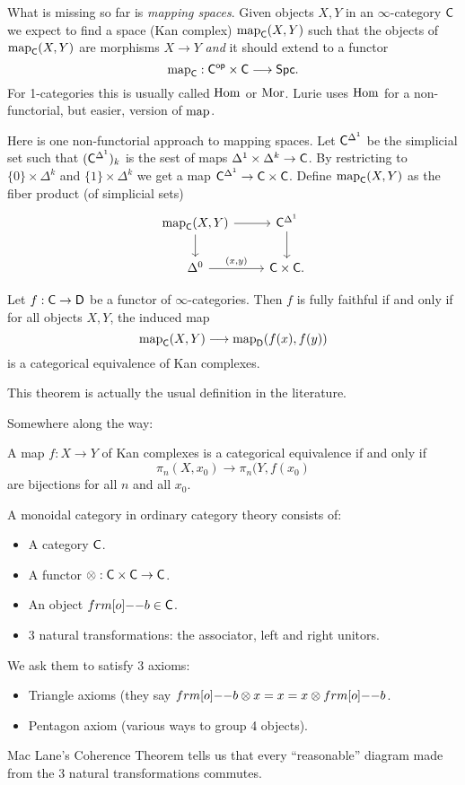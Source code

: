 What is missing so far is \emph{mapping spaces}. Given objects $X,Y$ in an $\infty$-category $\mathsf{C}$ we expect to find a space (Kan complex) $\operatorname{map}_\mathsf{C}(X,Y)$ such that the objects of $\operatorname{map}_\mathsf{C}(X,Y)$ are morphisms $X\to Y$ \emph{and} it should extend to a functor 
\[
	\map_\C : \C\op\times \C\to \cat{Spc}.
\] 
For 1-categories this is usually called $\operatorname{Hom}$ or $\operatorname{Mor}$. Lurie uses $\operatorname{Hom}$ for a non-functorial, but easier, version of $\operatorname{map}$.

Here is one non-functorial approach to mapping spaces. Let $\mathsf{C}^{\Delta^{1}}$ be the simplicial set such that $(\mathsf{C}^{\Delta^{1}})_k$ is the sest of maps $\Delta^{1}\times \Delta^{k}\to \C$. By restricting to $\{0\} \times \Delta^{k}$ and $\{1\} \times \Delta^{k}$ we get a map $\C^{\Delta^{1}}\to \C\times \C$. Define $\operatorname{map}_\mathsf{C}(X,Y)$ as the fiber product (of simplicial sets)
\[
\begin{tikzcd}
	\map_\C(X,Y) \ar[r] \ar[d] & \C^{\Delta^{1}} \ar[d] \\
	\Delta^{0} \ar[r,"{(x,y)}"] & \C\times \C.
\end{tikzcd}
\] 
\begin{theorem}
	Let $f:\C\to \cat{D}$ be a functor of $\infty$-categories. Then $f$ is fully faithful if and only if for all objects $X,Y$, the induced map
	\[
		\map_\C(X,Y)\to \map_{\cat{D}}(f(x),f(y))
	\] 
	is a categorical equivalence of Kan complexes.
\end{theorem}
This theorem is actually the usual definition in the literature.

Somewhere along the way:
\begin{theorem}
	A map $f:X\to Y$ of Kan complexes is a categorical equivalence if and only if 
	\[
	\pi_n(X,x_0) \to  \pi_n(Y,f(x_0)
	\] 
	are bijections for all $n$ and all $x_0$.
\end{theorem}
A monoidal category in ordinary category theory consists of:
\begin{itemize}
	\item A category $\mathsf{C}$.
	\item A functor $\otimes:\C\times \C\to \C$.
	\item An object $\1b\in \C$.
	\item 3 natural transformations: the associator, left and right unitors.
\end{itemize}
We ask them to satisfy 3 axioms:
\begin{itemize}
	\item Triangle axioms (they say $\1b\otimes x = x = x\otimes\1b$.
	\item Pentagon axiom (various ways to group 4 objects).
\end{itemize}
Mac Lane's Coherence Theorem tells us that every ``reasonable'' diagram made from the 3 natural transformations commutes.

